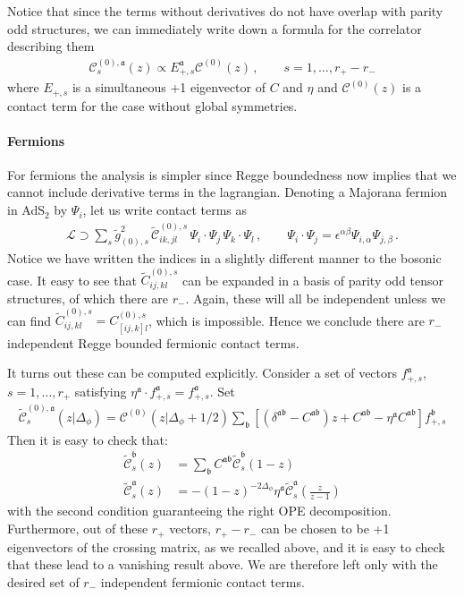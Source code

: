 \documentclass[12pt]{article}
\numberwithin{equation}{section}
\newcommand{\bea}{\begin{eqnarray}}
\newcommand{\eea}{\end{eqnarray}}
\newcommand{\ba}{\begin{equation}\begin{aligned}}
\newcommand{\ea}{\end{aligned}\end{equation}}
\newcommand{\Df}{{\Delta_\phi}}
\newcommand{\mf}[1]{\mathfrak #1}
\begin{document}
	Notice that since the terms without derivatives do not have overlap with parity odd structures, we can immediately write down a formula for the correlator describing them
	\bea
	\mathcal C_s^{(0),\mf a}(z)\propto E_{+,s}^{\mf a} \mathcal C^{(0)}(z)\,, \qquad s=1,\ldots,r_+-r_-
	\eea
	where $E_{+,s}$ is a simultaneous +1 eigenvector of $C$ and $\eta$ and $\mathcal C^{(0)}(z)$ is a contact term for the case without global symmetries.
	
	\paragraph{Fermions} For fermions the analysis is simpler since Regge boundedness now implies that we cannot include derivative terms in the lagrangian. Denoting a Majorana fermion in AdS$_2$ by $\Psi_i$, let us write contact terms as
	\bea
	\mathcal L\supset \sum_{s} \tilde g^2_{(0),s}\, \tilde {\mathcal C}^{(0),s}_{ik,jl}\, \Psi_i\cdot \Psi_j\, \Psi_k\cdot \Psi_l\,, \qquad \Psi_i\cdot \Psi_j=\epsilon^{\alpha \beta} \Psi_{i,\alpha}\Psi_{j,\beta}\,.
	\eea
	Notice we have written the indices in a slightly different manner to the bosonic case. It easy to see that $\tilde C^{(0),s}_{ij,kl}$ can be expanded in a basis of parity odd tensor structures, of which there are $r_-$. Again, these will all be independent unless we can find $\tilde C^{(0),s}_{ij,kl}=C^{(0),s}_{[ij,k]l}$, which is impossible. Hence we conclude there are $r_-$ independent Regge bounded fermionic contact terms.
	
	It turns out these can be computed explicitly. Consider a set of vectors $f_{+,s}^{\mf a}$, $s=1,\ldots,r_+$ satisfying $\eta^{\mf a} \cdot f_{+,s}^{\mf a}=f_{+,s}^{\mf a}$. Set
	\bea
	\tilde{\mathcal C}_s^{(0),\mf a}(z|\Df)=\mathcal C^{(0)}(z|\Df+1/2) \sum_{\mf b} \left[(\delta^{\mf a\mf b}-C^{\mf a\mf b})z+C^{\mf a \mf b}-\eta^{\mf a}C^{\mf a \mf b}\right] f_{+,s}^{\mf b}
	\eea
	Then it is easy to check that:
	\ba
	\tilde{\mathcal C}_s^{\mf b}(z)&=\sum_{\mf b} C^{\mf a \mf b}\tilde{\mathcal C}_s^{\mf b}(1-z)\\
	\tilde{\mathcal C}_s^{\mf a}(z)&=-(1-z)^{-2\Df} \eta^{\mf a}\tilde{\mathcal C}_s^{\mf a}(\mbox{$\frac{z}{z-1}$})
	\ea
	with the second condition guaranteeing the right OPE decomposition. Furthermore, out of these $r_+$ vectors, $r_+-r_-$ can be chosen to be +1 eigenvectors of the crossing matrix, as we recalled above, and it is easy to check that these lead to a vanishing result above. We are therefore left only with the desired set of $r_-$ independent fermionic contact terms.
	
\end{document}
